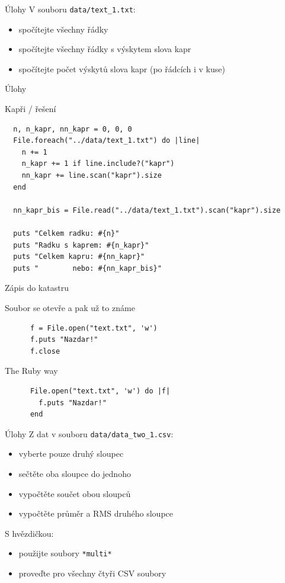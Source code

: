 \documentclass{beamer}
\begin{document}
\begin{frame}{Úlohy}
  V souboru \texttt{data/text\_1.txt}:
  \begin{itemize}
    \item spočítejte všechny řádky
    \item spočítejte všechny řádky s výskytem slova kapr
    \item spočítejte počet výskytů slova kapr (po řádcích i v kuse)
  \end{itemize}
\end{frame}

\begin{frame}[fragile]{Úlohy}
  \begin{block}{Kapři / řešení}
    \tiny
\begin{verbatim}
  n, n_kapr, nn_kapr = 0, 0, 0
  File.foreach("../data/text_1.txt") do |line|
    n += 1
    n_kapr += 1 if line.include?("kapr")
    nn_kapr += line.scan("kapr").size
  end

  nn_kapr_bis = File.read("../data/text_1.txt").scan("kapr").size

  puts "Celkem radku: #{n}"
  puts "Radku s kaprem: #{n_kapr}"
  puts "Celkem kapru: #{nn_kapr}"
  puts "        nebo: #{nn_kapr_bis}"
\end{verbatim}
  \end{block}
\end{frame}

\begin{frame}[fragile]{Zápis do katastru}
  \begin{block}{Soubor se otevře a pak už to známe}
    \begin{verbatim}
      f = File.open("text.txt", 'w')
      f.puts "Nazdar!"
      f.close
    \end{verbatim}
  \end{block}
  \pause
  \begin{block}{The Ruby way}
    \begin{verbatim}
      File.open("text.txt", 'w') do |f|
        f.puts "Nazdar!"
      end
    \end{verbatim}
  \end{block}
\end{frame}

\begin{frame}{Úlohy}
  Z dat v souboru \texttt{data/data\_two\_1.csv}:
  \begin{itemize}
    \item vyberte pouze druhý sloupec
    \item sečtěte oba sloupce do jednoho
    \item vypočtěte součet obou sloupců
    \item vypočtěte průměr a RMS druhého sloupce
  \end{itemize}
  S hvězdičkou:
  \begin{itemize}
    \item použijte soubory \texttt{*multi*}
    \item proveďte pro všechny čtyři CSV soubory
  \end{itemize}
\end{frame}
\end{document}
